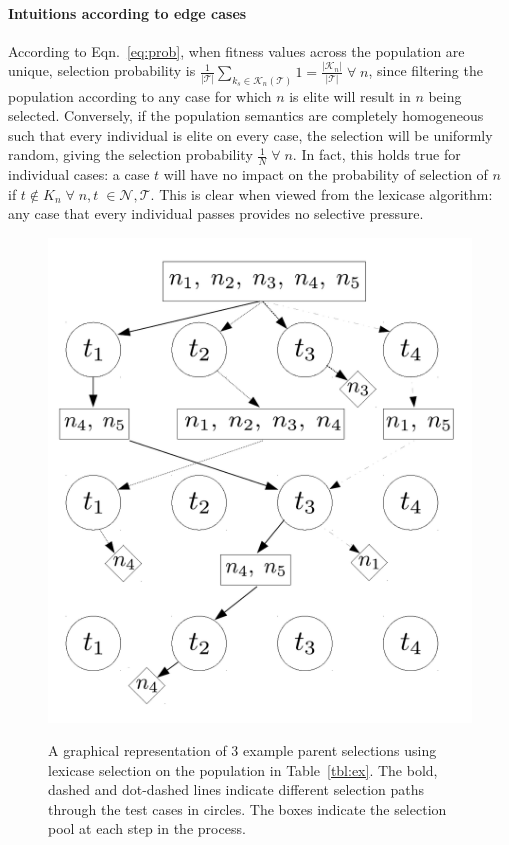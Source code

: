 \documentclass[preprint]{article}
\begin{document}
\paragraph{Intuitions according to edge cases}
According to Eqn.~\ref{eq:prob}, when fitness values across the population are unique, selection probability is $\frac{1}{|\mathcal{T}|} \sum_{k_s \in \mathcal{K}_n(\mathcal{T})} 1 = \frac{|\mathcal{K}_n|}{|\mathcal{T}|} \; \forall \; n$, since filtering the population according to any case for which $n$ is elite will result in $n$ being selected. Conversely, if the population semantics are completely homogeneous such that every individual is elite on every case, the selection will be uniformly random, giving the selection probability $\frac{1}{N} \; \forall \; n$. In fact, this holds true for individual cases: a case $t$ will have no impact on the probability of selection of $n$ if $t \notin K_n \; \forall \; n,t \; \in \mathcal{N}, \mathcal{T}$. This is clear when viewed from the lexicase algorithm: any case that every individual passes provides no selective pressure. 




\begin{figure}
\centering
  \includegraphics[height = 0.4\textheight]{figs/lex_graph.pdf}\label{fig:lex_graph}
  \caption{A graphical representation of 3 example parent selections using lexicase selection on the population in Table~\ref{tbl:ex}. The bold, dashed and dot-dashed lines indicate different selection paths through the test cases in circles. The boxes indicate the selection pool at each step in the process.}\label{fig:boxplot_eps_e}
\end{figure}
\end{document}
